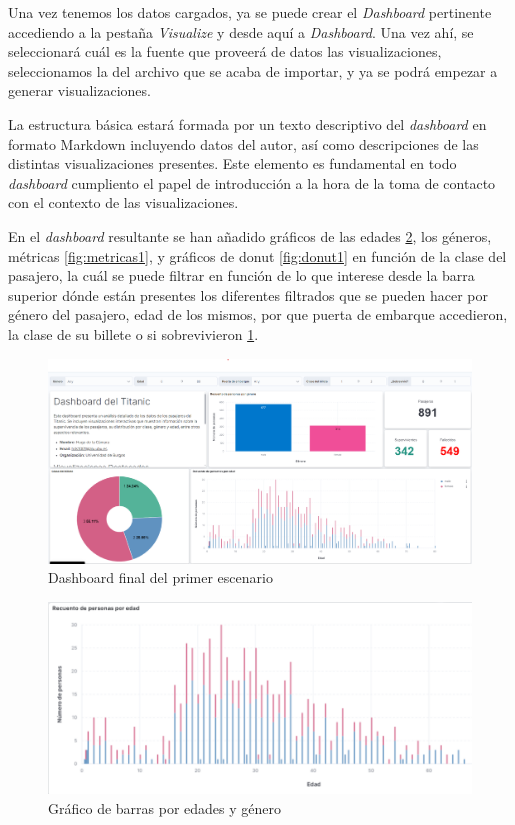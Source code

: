 Una vez tenemos los datos cargados, ya se puede crear el \textit{Dashboard} pertinente accediendo a la pestaña \textit{Visualize} y desde aquí a \textit{Dashboard}. Una vez ahí, se seleccionará cuál es la fuente que proveerá de datos las visualizaciones, seleccionamos la del archivo que se acaba de importar, y ya se podrá empezar a generar visualizaciones.

La estructura básica estará formada por un texto descriptivo del \textit{dashboard} en formato Markdown incluyendo datos del autor, así como descripciones de las distintas visualizaciones presentes. Este elemento es fundamental en todo \textit{dashboard} cumpliento el papel de introducción a la hora de la toma de contacto con el contexto de las visualizaciones.

En el \textit{dashboard} resultante se han añadido gráficos de las edades \ref{fig:barras1}, los géneros, métricas \ref{fig:metricas1}, y gráficos de donut \ref{fig:donut1} en función de la clase del pasajero, la cuál se puede filtrar en función de lo que interese desde la barra superior dónde están presentes los diferentes filtrados que se pueden hacer por género del pasajero, edad de los mismos, por que puerta de embarque accedieron, la clase de su billete o si sobrevivieron \ref{fig:escenario1}.

\begin{figure}
    \centering
    \includegraphics[width=1\linewidth]{img/escenario1.png}
    \caption{Dashboard final del primer escenario}
    \label{fig:escenario1}
\end{figure}

\begin{figure}
    \centering
    \includegraphics[width=1\linewidth]{img/edades.png}
    \caption{Gráfico de barras por edades y género}
    \label{fig:barras1}
\end{figure}


